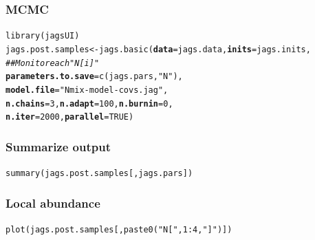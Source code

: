 \documentclass[color=usenames,dvipsnames]{beamer}\usepackage[]{graphicx}\usepackage[]{xcolor}
\makeatletter
\newcommand{\hlnum}[1]{\textcolor[rgb]{0.69,0.494,0}{#1}}%
\newcommand{\hlsng}[1]{\textcolor[rgb]{0.749,0.012,0.012}{#1}}%
\newcommand{\hlcom}[1]{\textcolor[rgb]{0.514,0.506,0.514}{\textit{#1}}}%
\newcommand{\hlopt}[1]{\textcolor[rgb]{0,0,0}{#1}}%
\newcommand{\hldef}[1]{\textcolor[rgb]{0,0,0}{#1}}%
\newcommand{\hlkwb}[1]{\textcolor[rgb]{0,0.341,0.682}{#1}}%
\newcommand{\hlkwc}[1]{\textcolor[rgb]{0,0,0}{\textbf{#1}}}%
\newcommand{\hlkwd}[1]{\textcolor[rgb]{0.004,0.004,0.506}{#1}}%
\newenvironment{kframe}{%
 \def\at@end@of@kframe{}%
 \ifinner\ifhmode%
  \def\at@end@of@kframe{\end{minipage}}%
  \begin{minipage}{\columnwidth}%
 \fi\fi%
 \def\FrameCommand##1{\hskip\@totalleftmargin \hskip-\fboxsep
 \colorbox{shadecolor}{##1}\hskip-\fboxsep
     \hskip-\linewidth \hskip-\@totalleftmargin \hskip\columnwidth}%
 \MakeFramed {\advance\hsize-\width
   \@totalleftmargin\z@ \linewidth\hsize
   \@setminipage}}%
 {\par\unskip\endMakeFramed%
 \at@end@of@kframe}
\newenvironment{knitrout}{}{} %
\let\hlstd\hldef
\let\hlstr\hlsng
\makeatother
\begin{document}
\begin{frame}[fragile]
  \frametitle{MCMC}
  \small
\begin{knitrout}\scriptsize
{}\color{fgcolor}\begin{kframe}
\begin{alltt}
\hlkwd{library}\hlstd{(jagsUI)}
\hlstd{jags.post.samples} \hlkwb{<-} \hlkwd{jags.basic}\hlstd{(}\hlkwc{data}\hlstd{=jags.data,} \hlkwc{inits}\hlstd{=jags.inits,}
                                \hlcom{## Monitor each "N[i]" }
                                \hlkwc{parameters.to.save}\hlstd{=}\hlkwd{c}\hlstd{(jags.pars,} \hlstr{"N"}\hlstd{),}
                                \hlkwc{model.file}\hlstd{=}\hlstr{"Nmix-model-covs.jag"}\hlstd{,}
                                \hlkwc{n.chains}\hlstd{=}\hlnum{3}\hlstd{,} \hlkwc{n.adapt}\hlstd{=}\hlnum{100}\hlstd{,} \hlkwc{n.burnin}\hlstd{=}\hlnum{0}\hlstd{,}
                                \hlkwc{n.iter}\hlstd{=}\hlnum{2000}\hlstd{,} \hlkwc{parallel}\hlstd{=}\hlnum{TRUE}\hlstd{)}
\end{alltt}
\end{kframe}
\end{knitrout}
\end{frame}



\begin{frame}[fragile]
  \frametitle{Summarize output}
\begin{knitrout}\tiny
{}\color{fgcolor}\begin{kframe}
\begin{alltt}
\hlkwd{summary}\hldef{(jags.post.samples[,jags.pars])}
\end{alltt}


{\ttfamily\noindent\bfseries\color{errorcolor}{\#\# Error in h(simpleError(msg, call)): error in evaluating the argument 'object' in selecting a method for function 'summary': incorrect number of dimensions}}\end{kframe}
\end{knitrout}
\end{frame}


\begin{frame}[fragile]
  \frametitle{Local abundance}
\begin{knitrout}\scriptsize
{}\color{fgcolor}\begin{kframe}
\begin{alltt}
\hlkwd{plot}\hldef{(jags.post.samples[,}\hlkwd{paste0}\hldef{(}\hlsng{"N["}\hldef{,} \hlnum{1}\hlopt{:}\hlnum{4}\hldef{,} \hlsng{"]"}\hldef{)])}
\end{alltt}


{\ttfamily\noindent\bfseries\color{errorcolor}{\#\# Error in h(simpleError(msg, call)): error in evaluating the argument 'x' in selecting a method for function 'plot': incorrect number of dimensions}}\end{kframe}
\end{knitrout}
\end{frame}
\end{document}
